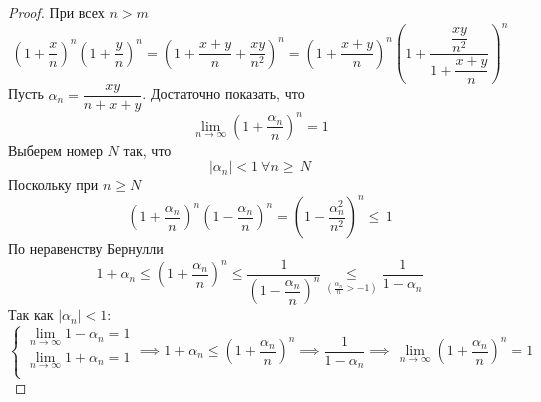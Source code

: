 \begin{proposition}
\end{proposition} \begin{proof}
    При всех $ n > m$ \begin{equation}
        \left(1 + \dfrac{x}{n}\right)^n\left(1 + \dfrac{y}{n}\right)^n = \left( 1 + \dfrac{x + y}{n} + \dfrac{xy}{n^2}  \right)^n = \left(1 + \dfrac{x + y}{n} \right)^n\left(1 + \dfrac{\dfrac{xy}{n^2} }{1 + \dfrac{x + y}{n} }\right)^ n
    \end{equation}
    Пусть $ \alpha_n = \dfrac{xy}{n + x + y}  $. Достаточно показать, что \begin{equation}
        \lim_{n \to \infty}\left(1 + \frac{\alpha_n}{n} \right)^n = 1
    \end{equation}
    Выберем номер $ N $ так, что \begin{equation}
        |\alpha_n| < 1 \:\forall n \geq\, N
    \end{equation}
    Поскольку при $ n \geq N $ \begin{equation}
        \left(1 + \frac{\alpha_n}{n} \right)^n\left(1 - \frac{\alpha_n}{n} \right)^n = \left(1 - \dfrac{\alpha_n^2}{n^2} \right)^n \leq\, 1
    \end{equation}
    По неравенству Бернулли \begin{equation}
        1 + \alpha_n  \leq \left(1 + \dfrac{\alpha_n}{n} \right)^n \leq \dfrac{1}{\left(1 - \dfrac{\alpha_n}{n}\right)^n} \underset{\left(\frac{\alpha_n}{n} > - 1\right)}{ \leq }\dfrac{1}{1 - \alpha_n}
    \end{equation}
    Так как $ |\alpha_n| < 1 $:
    \begin{equation}
    \begin{cases}
        \lim_{n \to \infty}1 - \alpha_n = 1 \\
        \lim_{n \to \infty}1 + \alpha_n = 1 \\
    \end{cases} \implies 1 + \alpha_n \leq \left(1 + \dfrac{\alpha_n}{n}\right)^n \implies \dfrac{1}{1 - \alpha_n} \implies\,\lim_{n \to \infty}\left(1 + \dfrac{\alpha_n}{n}\right)^n = 1 
   \end{equation}
   
   
    
    
\end{proof}
